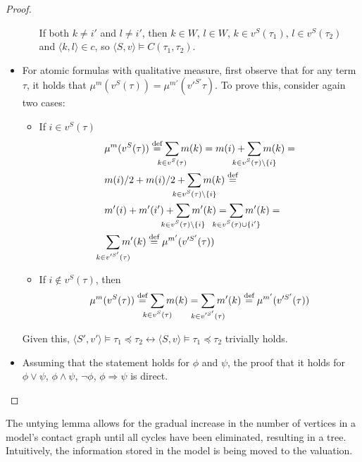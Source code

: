 \documentclass{article}
\newcommand{\lcont}{C}
\newcommand{\lmeasure}{\preceq}
\newcommand{\eqdef}{\stackrel{\text{def}}{=}}
\begin{document}
\begin{proof}
\begin{itemize}
\begin{itemize}
      If both $k \neq i'$ and $l \neq i'$, then $k \in W$, $l \in W$, $k \in v^S(\tau_1)$, $l \in v^S(\tau_2)$ and $\langle k, l \rangle \in c$, so $\langle S, v \rangle \models \lcont(\tau_1, \tau_2)$.
    \end{itemize}
  \item For atomic formulas with qualitative measure, first observe that for any term $\tau$, it holds that $\mu^m(v^S(\tau)) = \mu^{m'}(v'^{S'}\tau)$. To prove this, consider again two cases:
    \begin{itemize}
    \item If $i \in v^S(\tau)$
      \begin{align*}
        & \mu^m(v^S(\tau)) \eqdef \sum_{\mathclap{k \in v^S(\tau)}}m(k) = m(i) + \sum_{\mathclap{k \in v^S(\tau) \setminus \{i\}}}m(k) = \\
        & m(i) / 2 + m(i) / 2 + \sum_{\mathclap{k \in v^S(\tau) \setminus \{i\}}}m(k) \eqdef \\
        & m'(i) + m'(i') + \sum_{\mathclap{k \in v^S(\tau) \setminus \{i\}}}m'(k) = \sum_{\mathclap{k \in v^S(\tau) \cup \{i'\}}}m'(k) = \\
        & \sum_{\mathclap{k \in v'^{S'}(\tau)}}m'(k) \eqdef \mu^{m'}(v'^{S'}(\tau))
      \end{align*}
    \item If $i \not \in v^S(\tau)$, then
      \begin{equation*}
        \mu^m(v^S(\tau)) \eqdef \sum_{\mathclap{k \in v^S(\tau)}}m(k) = \sum_{\mathclap{k \in v'^{S'}(\tau)}}m'(k) \eqdef \mu^{m'}(v'^{S'}(\tau))
      \end{equation*}
    \end{itemize}
    Given this, $\langle S', v' \rangle \models \tau_1 \lmeasure \tau_2 \leftrightarrow \langle S, v \rangle \models \tau_1 \lmeasure \tau_2$ trivially holds.
  \item Assuming that the statement holds for $\phi$ and $\psi$, the proof that it holds for $\phi \lor \psi$, $\phi \land \psi$, $\lnot \phi$, $\phi \Rightarrow \psi$ is direct.
\end{itemize}
\end{proof}

The untying lemma allows for the gradual increase in the number of vertices in a model's contact graph until all cycles have been eliminated, resulting in a tree. Intuitively, the information stored in the model is being moved to the valuation.
\end{document}
